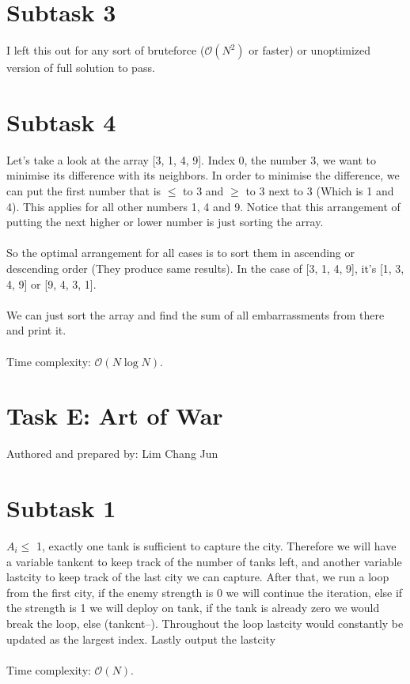 \documentclass{report}
\begin{document}
\section*{Subtask 3}
I left this out for any sort of bruteforce ($\mathcal{O}(N^2)$ or faster) or unoptimized version of full solution to pass.

\section*{Subtask 4}
Let's take a look at the array [3, 1, 4, 9]. Index 0, the number 3, we want to minimise its difference with its neighbors. In order to minimise the difference, we can put the first number that is $\leq$ to 3 and $\geq$ to 3 next to 3 (Which is 1 and 4). This applies for all other numbers 1, 4 and 9. Notice that this arrangement of putting the next higher or lower number is just sorting the array.
\\\\
So the optimal arrangement for all cases is to sort them in ascending or descending order (They produce same results). In the case of [3, 1, 4, 9], it's [1, 3, 4, 9] or [9, 4, 3, 1].
\\\\
We can just sort the array and find the sum of all embarrassments from there and print it.
\\\\
Time complexity: $\mathcal{O}(N\log{}N)$.

\pagebreak

\section*{Task E: Art of War}
Authored and prepared by: Lim Chang Jun

\section*{Subtask 1} 
$A_{i}\leq$  1, exactly one tank is sufficient to capture the city. Therefore we will have a variable tank\textunderscore cnt to keep track of the number of tanks left, and another variable last\textunderscore city to keep track of the last city we can capture. After that, we run a loop from the first city, if the enemy strength is 0 we will continue the iteration, else if the strength is 1 we will deploy on tank, if the tank is already zero we would break the loop, else (tank\textunderscore cnt--). Throughout the loop last\textunderscore city would constantly be updated as the largest index. Lastly output the last\textunderscore city
\\\\
Time complexity: $\mathcal{O}(N)$.
\end{document}

